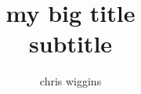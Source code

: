 \documentclass{beamer} %
\begin{document}

\title[]{my big title \\subtitle}
\author[chris.wiggins@columbia.edu ]{chris wiggins}
\frame
{
\titlepage
}
\frame
{
\tableofcontents
}

\renewcommand{\theta}{\vartheta}
\end{document}
